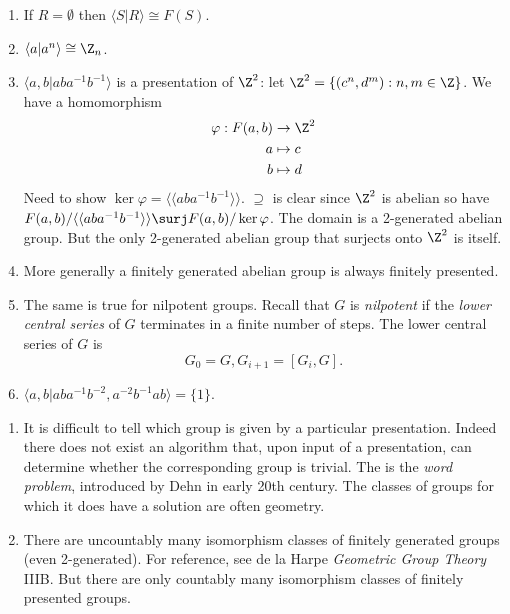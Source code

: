 \documentclass[a4paper]{article}
\begin{document}
\begin{eg}\leavevmode
  \begin{enumerate}
  \item If \(R = \emptyset\) then \(\langle S|R \rangle \cong F(S)\).
  \item \(\langle a|a^n \rangle \cong \Z_n\).
  \item \(\langle a, b|aba^{-1}b^{-1}\rangle\) is a presentation of \(\Z^2\): let \(\Z^2 = \{(c^n, d^m): n, m \in \Z\}\). We have a homomorphism
    \begin{align*}
      \varphi: F(a, b) &\to \Z^2 \\
      a &\mapsto c \\
      b &\mapsto d
    \end{align*}
    Need to show \(\ker \varphi = \langle\langle aba^{-1}b^{-1} \rangle\rangle\). \(\supseteq\) is clear since \(\Z^2\) is abelian so have \(F(a, b)/\langle\langle aba^{-1}b^{-1} \rangle\rangle \surj F(a, b)/\ker \varphi\). The domain is a 2-generated abelian group. But the only 2-generated abelian group that surjects onto \(\Z^2\) is itself.
  \item More generally a finitely generated abelian group is always finitely presented.
  \item The same is true for nilpotent groups. Recall that \(G\) is \emph{nilpotent} if the \emph{lower central series} of \(G\) terminates in a finite number of steps. The lower central series of \(G\) is
    \[
      G_0 = G, G_{i + 1} = [G_i, G].
    \]
  \item \(\langle a, b| aba^{-1}b^{-2}, a^{-2}b^{-1}ab \rangle = \{1\}\).
  \end{enumerate}
\end{eg}

\begin{remark}\leavevmode
  \begin{enumerate}
  \item It is difficult to tell which group is given by a particular presentation. Indeed there does not exist an algorithm that, upon input of a presentation, can determine whether the corresponding group is trivial. The is the \emph{word problem}, introduced by Dehn in early 20th century. The classes of groups for which it does have a solution are often geometry.
  \item There are uncountably many isomorphism classes of finitely generated groups (even 2-generated). For reference, see de la Harpe \emph{Geometric Group Theory} IIIB. But there are only countably many isomorphism classes of finitely presented groups.
  \end{enumerate}
\end{remark}
\end{document}
